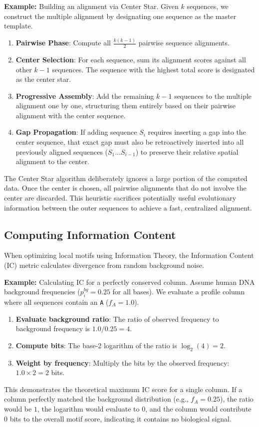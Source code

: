 \textbf{Example:}
Building an alignment via Center Star.
Given $k$ sequences, we construct the multiple alignment by designating one sequence as the master template.
\begin{enumerate}
  \item \textbf{Pairwise Phase}: Compute all $\frac{k(k-1)}{2}$ pairwise sequence alignments.
  \item \textbf{Center Selection}: For each sequence, sum its alignment scores against all other $k-1$ sequences. The sequence with the highest total score is designated as the center star.
  \item \textbf{Progressive Assembly}: Add the remaining $k-1$ sequences to the multiple alignment one by one, structuring them entirely based on their pairwise alignment with the center sequence.
  \item \textbf{Gap Propagation}: If adding sequence $S_i$ requires inserting a gap into the center sequence, that exact gap must also be retroactively inserted into all previously aligned sequences ($S_1 \dots S_{i-1}$) to preserve their relative spatial alignment to the center.
\end{enumerate}
\sta The Center Star algorithm deliberately ignores a large portion of the computed data. Once the center is chosen, all pairwise alignments that do not involve the center are discarded. This heuristic sacrifices potentially useful evolutionary information between the outer sequences to achieve a fast, centralized alignment.

\subsection{Computing Information Content}
When optimizing local motifs using Information Theory, the Information Content (IC) metric calculates divergence from random background noise. 

\textbf{Example:}
Calculating IC for a perfectly conserved column.
Assume human DNA background frequencies ($p_i^{bg} = 0.25$ for all bases). We evaluate a profile column where all sequences contain an \texttt{A} ($f_A = 1.0$).
\begin{enumerate}
  \item \textbf{Evaluate background ratio}: The ratio of observed frequency to background frequency is $1.0 / 0.25 = 4$.
  \item \textbf{Compute bits}: The base-2 logarithm of the ratio is $\log_2(4) = 2$.
  \item \textbf{Weight by frequency}: Multiply the bits by the observed frequency: $1.0 \times 2 = 2$ bits.
\end{enumerate}
This demonstrates the theoretical maximum IC score for a single column. If a column perfectly matched the background distribution (e.g., $f_A = 0.25$), the ratio would be $1$, the logarithm would evaluate to $0$, and the column would contribute $0$ bits to the overall motif score, indicating it contains no biological signal.

